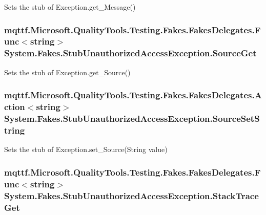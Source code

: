 Sets the stub of Exception.\-get\-\_\-\-Message()

\hypertarget{class_system_1_1_fakes_1_1_stub_unauthorized_access_exception_a87f29516d7fcc67bf019d74bc77eb82c}{
\subsubsection[{Source\-Get}]{\setlength{\rightskip}{0pt plus 5cm}mqttf.\-Microsoft.\-Quality\-Tools.\-Testing.\-Fakes.\-Fakes\-Delegates.\-Func$<$string$>$ System.\-Fakes.\-Stub\-Unauthorized\-Access\-Exception.\-Source\-Get}}\label{class_system_1_1_fakes_1_1_stub_unauthorized_access_exception_a87f29516d7fcc67bf019d74bc77eb82c}


Sets the stub of Exception.\-get\-\_\-\-Source()

\hypertarget{class_system_1_1_fakes_1_1_stub_unauthorized_access_exception_a1e3800630fedf00d7817a60d43340c62}{
\subsubsection[{Source\-Set\-String}]{\setlength{\rightskip}{0pt plus 5cm}mqttf.\-Microsoft.\-Quality\-Tools.\-Testing.\-Fakes.\-Fakes\-Delegates.\-Action$<$string$>$ System.\-Fakes.\-Stub\-Unauthorized\-Access\-Exception.\-Source\-Set\-String}}\label{class_system_1_1_fakes_1_1_stub_unauthorized_access_exception_a1e3800630fedf00d7817a60d43340c62}


Sets the stub of Exception.\-set\-\_\-\-Source(\-String value)

\hypertarget{class_system_1_1_fakes_1_1_stub_unauthorized_access_exception_a54fed4aa6f9465f5a386e13b0785c76f}{
\subsubsection[{Stack\-Trace\-Get}]{\setlength{\rightskip}{0pt plus 5cm}mqttf.\-Microsoft.\-Quality\-Tools.\-Testing.\-Fakes.\-Fakes\-Delegates.\-Func$<$string$>$ System.\-Fakes.\-Stub\-Unauthorized\-Access\-Exception.\-Stack\-Trace\-Get}}\label{class_system_1_1_fakes_1_1_stub_unauthorized_access_exception_a54fed4aa6f9465f5a386e13b0785c76f}



